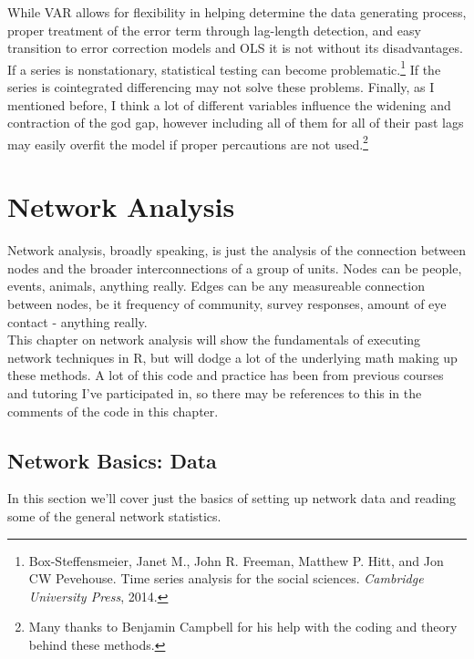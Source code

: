 \documentclass[12pt]{article}\usepackage[]{graphicx}\usepackage[]{color}
\begin{document}
\begin{flushleft}
While VAR allows for flexibility in helping determine the data generating process, proper treatment of the error term through lag-length detection, and easy transition to error correction models and OLS it is not without its disadvantages. If a series is nonstationary, statistical testing can become problematic.\footnote{Box-Steffensmeier, Janet M., John R. Freeman, Matthew P. Hitt, and Jon CW Pevehouse. Time series analysis for the social sciences. \textit{Cambridge University Press}, 2014.} If the series is cointegrated differencing may not solve these problems. Finally, as I mentioned before, I think a lot of different variables influence the widening and contraction of the god gap, however including all of them for all of their past lags may easily overfit the model if proper percautions are not used.\footnote{Many thanks to Benjamin Campbell for his help with the coding and theory behind these methods.}



\clearpage
\section{Network Analysis}

Network analysis, broadly speaking, is just the analysis of the connection between nodes and the broader interconnections of a group of units. Nodes can be people, events, animals, anything really. Edges can be any measureable connection between nodes, be it frequency of community, survey responses, amount of eye contact - anything really.\\

This chapter on network analysis will show the fundamentals of executing network techniques in R, but will dodge a lot of the underlying math making up these methods. A lot of this code and practice has been from previous courses and tutoring I've participated in, so there may be references to this in the comments of the code in this chapter. \\

\subsection{Network Basics: Data}

In this section we'll cover just the basics of setting up network data and reading some of the general network statistics.


\end{flushleft}
\end{document}
